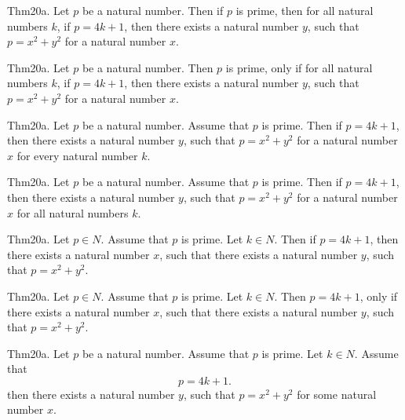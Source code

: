 \documentclass{article}
\begin{document}
Thm20a. Let $p$ be a natural number. Then if $p$ is prime, then for all natural numbers $k$, if $p = 4 k + 1$, then there exists a natural number $y$, such that $p = x ^{ 2}+ y ^{ 2}$ for a natural number $x$.

Thm20a. Let $p$ be a natural number. Then $p$ is prime, only if for all natural numbers $k$, if $p = 4 k + 1$, then there exists a natural number $y$, such that $p = x ^{ 2}+ y ^{ 2}$ for a natural number $x$.

Thm20a. Let $p$ be a natural number. Assume that $p$ is prime. Then if $p = 4 k + 1$, then there exists a natural number $y$, such that $p = x ^{ 2}+ y ^{ 2}$ for a natural number $x$ for every natural number $k$.

Thm20a. Let $p$ be a natural number. Assume that $p$ is prime. Then if $p = 4 k + 1$, then there exists a natural number $y$, such that $p = x ^{ 2}+ y ^{ 2}$ for a natural number $x$ for all natural numbers $k$.

Thm20a. Let $p \in N$. Assume that $p$ is prime. Let $k \in N$. Then if $p = 4 k + 1$, then there exists a natural number $x$, such that there exists a natural number $y$, such that $p = x ^{ 2}+ y ^{ 2}$.

Thm20a. Let $p \in N$. Assume that $p$ is prime. Let $k \in N$. Then $p = 4 k + 1$, only if there exists a natural number $x$, such that there exists a natural number $y$, such that $p = x ^{ 2}+ y ^{ 2}$.

Thm20a. Let $p$ be a natural number. Assume that $p$ is prime. Let $k \in N$. Assume that $$p = 4 k + 1.$$ then there exists a natural number $y$, such that $p = x ^{ 2}+ y ^{ 2}$ for some natural number $x$.
\end{document}
